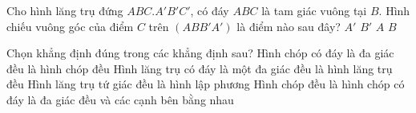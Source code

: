 		\begin{ex}%
				Cho hình lăng trụ đứng $ABC. A' B' C'$, có đáy $ABC$ là tam giác vuông tại $B$. Hình chiếu vuông góc của điểm $C$ trên $\left(ABB' A'\right)$ là điểm nào sau đây? \choice
			{$A'$}
			{$B'$}
			{$A$}
			{\True $B$}
			
			\end{ex}

\begin{ex}%
Chọn khẳng định đúng trong các khẳng định sau?
\choice
{Hình chóp có đáy là đa giác đều là hình chóp đều}
{Hình lăng trụ có đáy là một đa giác đều là hình lăng trụ đều}
{Hình lăng trụ tứ giác đều là hình lập phương}
{\True Hình chóp đều là hình chóp có đáy là đa giác đều và các cạnh bên bằng nhau}
\end{ex}

